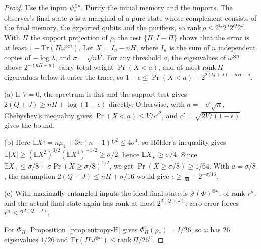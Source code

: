 \documentclass[11pt,a4paper]{article}
\theoremstyle{plain}
\theoremstyle{definition}
\theoremstyle{remark}
\begin{document}
\begin{proof}
Use the input $\psi_*^{\otimes n}$. Purify the initial memory and the imports. The observer's final state $\rho$ is a
marginal of a pure state whose complement consists of the final memory, the exported qubits and the purifiers, so
$\mathrm{rank}\,\rho\le2^Q2^J2^Q2^J$. With $\Pi$ the support projection of $\rho$, the test $\{\Pi,I-\Pi\}$ shows that the error is at
least $1-\mathrm{Tr}(\Pi\omega^{\otimes n})$. Let $X=I_n-nH$, where $I_n$ is the sum of $n$ independent copies of $-\log\lambda$, and
$\sigma=\sqrt{nV}$. For any threshold $a$, the eigenvalues of $\omega^{\otimes n}$ above $2^{-(nH+a)}$ carry total weight
$\Pr(X<a)$, and at most $\mathrm{rank}\,\Pi$ eigenvalues below it enter the trace, so
$1-\epsilon\le\Pr(X<a)+2^{2(Q+J)-nH-a}$.

(a) If $V=0$, the spectrum is flat and the support test gives $2(Q+J)\ge nH+\log(1-\epsilon)$ directly. Otherwise, with $a=-c'\sqrt n$,
Chebyshev's inequality gives $\Pr(X<a)\le V/c'^2$, and $c'=\sqrt{2V/(1-\epsilon)}$ gives the bound.

(b) Here $\mathbb EX^4=n\mu_4+3n(n-1)V^2\le4\sigma^4$, so Hölder's inequality gives
$\mathbb E|X|\ge(\mathbb EX^2)^{3/2}(\mathbb EX^4)^{-1/2}\ge\sigma/2$, hence $\mathbb EX_+\ge\sigma/4$. Since
$\mathbb EX_+\le\sigma/8+\sigma\Pr(X\ge\sigma/8)^{1/2}$, we get $\Pr(X\ge\sigma/8)\ge1/64$. With $a=\sigma/8$, the assumption
$2(Q+J)\le nH+\sigma/16$ would give $\epsilon\ge\frac1{64}-2^{-\sigma/16}$.

(c) With maximally entangled inputs the ideal final state is $\mathcal J(\Phi)^{\otimes n}$, of rank $r^n$, and the actual final
state again has rank at most $2^{2(Q+J)}$; zero error forces $r^n\le2^{2(Q+J)}$.

For $\Phi_H$, Proposition~\ref{prop:entropy-H} gives $\Phi_H^c(\rho_*)=I/26$, so $\omega$ has $26$ eigenvalues $1/26$ and
$\mathrm{Tr}(\Pi\omega^{\otimes n})\le\mathrm{rank}\,\Pi/26^n$.
\end{proof}
\end{document}
